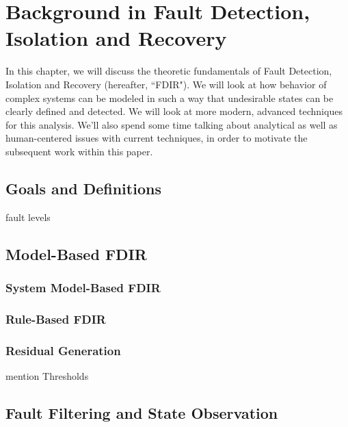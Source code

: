 \chapter{Background in Fault Detection, Isolation and Recovery}

In this chapter, we will discuss the theoretic fundamentals of Fault Detection, Isolation and Recovery (hereafter, ``FDIR"). We will look at how behavior of complex systems can be modeled in such a way that undesirable states can be clearly defined and detected. We will look at more modern, advanced techniques for this analysis. We'll also spend some time talking about analytical as well as human-centered issues with current techniques, in order to motivate the subsequent work within this paper.

\section{Goals and Definitions}


\cite{schwabacher2008pre}
\cite{dearden2004real}

fault levels
\cite{tipaldi2014spacecraft}


\section{Model-Based FDIR}

\cite{willsky1976survey}


\subsection{System Model-Based FDIR}

\cite{hwang2010survey}


\subsection{Rule-Based FDIR}


\cite{schwabacher2008pre}


\subsection{Residual Generation}


mention Thresholds

\section{Fault Filtering and State Observation}


